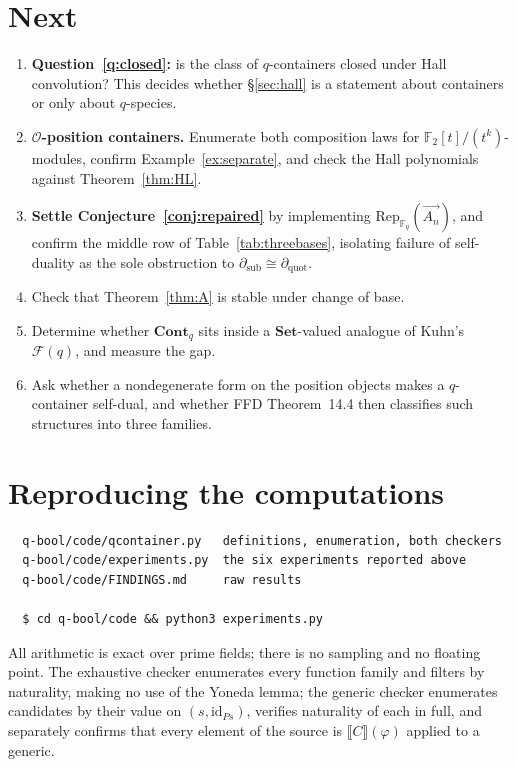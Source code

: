 \documentclass[11pt,a4paper]{article}
\theoremstyle{definition}
\theoremstyle{remark}
\newcommand{\FF}{\mathbb{F}}
\newcommand{\cat}[1]{\mathbf{#1}}
\newcommand{\Set}{\cat{Set}}
\newcommand{\Cont}{\cat{Cont}}
\newcommand{\Rep}{\mathrm{Rep}}
\newcommand{\ext}[1]{\llbracket #1 \rrbracket}
\begin{document}
\section{Next}

\begin{enumerate}[nosep]
  \item \textbf{Question~\ref{q:closed}:} is the class of $q$-containers closed
        under Hall convolution? This decides whether \S\ref{sec:hall} is a
        statement about containers or only about $q$-species.
  \item \textbf{$\mathcal{O}$-position containers.} Enumerate both composition
        laws for $\FF_2[t]/(t^{k})$-modules, confirm Example~\ref{ex:separate},
        and check the Hall polynomials against Theorem~\ref{thm:HL}.
  \item \textbf{Settle Conjecture~\ref{conj:repaired}} by implementing
        $\Rep_{\FF_q}(\vec{A_n})$, and confirm the middle row of
        Table~\ref{tab:threebases}, isolating failure of self-duality as the sole
        obstruction to $\partial_{\mathrm{sub}} \cong \partial_{\mathrm{quot}}$.
  \item Check that Theorem~\ref{thm:A} is stable under change of base.
  \item Determine whether $\Cont_q$ sits inside a $\Set$-valued analogue of
        Kuhn's $\mathcal{F}(q)$, and measure the gap.
  \item Ask whether a nondegenerate form on the position objects makes a
        $q$-container self-dual, and whether FFD Theorem~14.4 then classifies such
        structures into three families.
\end{enumerate}

\appendix
\section{Reproducing the computations}

\begin{verbatim}
  q-bool/code/qcontainer.py   definitions, enumeration, both checkers
  q-bool/code/experiments.py  the six experiments reported above
  q-bool/code/FINDINGS.md     raw results

  $ cd q-bool/code && python3 experiments.py
\end{verbatim}

\noindent
All arithmetic is exact over prime fields; there is no sampling and no floating
point. The exhaustive checker enumerates every function family and filters by
naturality, making no use of the Yoneda lemma; the generic checker enumerates
candidates by their value on $(s,\mathrm{id}_{P s})$, verifies naturality of each
in full, and separately confirms that every element of the source is
$\ext{C}(\varphi)$ applied to a generic.
\end{document}
